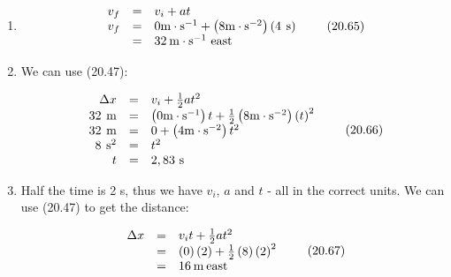 {\begin{mdframed}[linewidth=4, leftmargin=40, rightmargin=40]
\begin{exercise}
\begin{enumerate}[noitemsep, label=\textbf{Step} \textbf{\arabic*}. ]
    \begin{equation}
    {v}_{f}={v}_{i}+at\tag{20.64}
      \end{equation}
          \item  
          \label{m38796*id78878}\nopagebreak\noindent{}
    \begin{equation}
    \begin{array}{ccc}\hfill {v}_{f}& =& {v}_{i}+at\hfill \\ \hfill {v}_{f}& =& 0\mathrm{m}\ensuremath{\cdot}{\mathrm{s}}^{-1}+\left(8\mathrm{m}\ensuremath{\cdot}{\mathrm{s}}^{-2}\right)\left(4\phantom{\rule{4pt}{0ex}}\mathrm{s}\right)\hfill \\ & =& 32\phantom{\rule{2pt}{0ex}}\mathrm{m}\ensuremath{\cdot}{\mathrm{s}}^{-1}\phantom{\rule{3.33333pt}{0ex}}\mathrm{east}\hfill \end{array}\tag{20.65}
      \end{equation}
          \item  
          \label{m38796*id79042}We can use (20.47):\par 
          \label{m38796*id79048}\nopagebreak\noindent{}
    \begin{equation}
    \begin{array}{ccc}\hfill \Delta x& =& {v}_{i}+\frac{1}{2}a{t}^{2}\hfill \\ \hfill 32\phantom{\rule{4pt}{0ex}}\mathrm{m}& =& \left(0\mathrm{m}\ensuremath{\cdot}{\mathrm{s}}^{-1}\right)t+\frac{1}{2}\left(8\mathrm{m}\ensuremath{\cdot}{\mathrm{s}}^{-2}\right){\left(t\right)}^{2}\hfill \\ \hfill 32\phantom{\rule{4pt}{0ex}}\mathrm{m}& =& 0+\left(4\mathrm{m}\ensuremath{\cdot}{\mathrm{s}}^{-2}\right){t}^{2}\hfill \\ \hfill 8\phantom{\rule{4pt}{0ex}}{\mathrm{s}}^{2}& =& {t}^{2}\hfill \\ \hfill t& =& 2,83\phantom{\rule{3.33333pt}{0ex}}\mathrm{s}\hfill \end{array}\tag{20.66}
      \end{equation}
          \item  
          \label{m38796*id79324}Half the time is 2 s, thus we have ${v}_{i}$, $a$ and $t$ - all in the correct units. We can use (20.47) to get the distance:\par 
          \label{m38796*id79363}\nopagebreak\noindent{}
    \begin{equation}
    \begin{array}{ccc}\hfill \Delta x& =& {v}_{i}t+\frac{1}{2}a{t}^{2}\hfill \\ & =& \left(0\right)\left(2\right)+\frac{1}{2}\left(8\right){\left(2\right)}^{2}\hfill \\ & =& 16\phantom{\rule{2pt}{0ex}}\mathrm{m}\phantom{\rule{2pt}{0ex}}\mathrm{east}\hfill \end{array}\tag{20.67}

\end{equation}
\end{enumerate}
\end{exercise}
\end{mdframed}}
